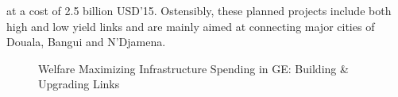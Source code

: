 \documentclass[a4paper]{article}
\begin{document}
\noindent at a cost of 2.5 billion USD'15. Ostensibly, these planned projects include both high and low yield links and are mainly aimed at connecting major cities of Douala, Bangui and N'Djamena. %

\begin{figure}[H] \vspace{-1mm}
\centering
\caption{\label{fig:GE_BUGNOfr} Welfare Maximizing Infrastructure Spending in GE: Building \& Upgrading Links}
\vspace{2mm}
\end{figure}
\end{document}
